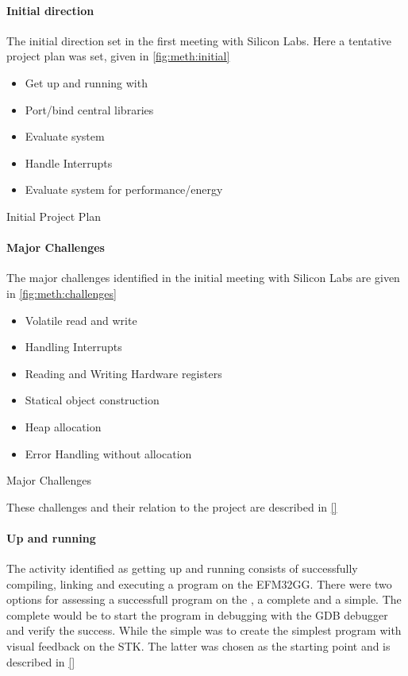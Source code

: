 \paragraph{Initial direction}
The initial direction set in the first meeting with Silicon Labs.
Here a tentative project plan was set, given in \autoref{fig:meth:initial}

\begin{listing}[H]
  \begin{itemize}
    \item Get up and running with \rust
    \item Port/bind central libraries
    \item Evaluate system
    \item Handle Interrupts
    \item Evaluate system for performance/energy
  \end{itemize}
  \caption{Initial Project Plan}
  \label{fig:meth:initial}
\end{listing}

\paragraph{Major Challenges}

The major challenges identified in the initial meeting with Silicon Labs are given in \autoref{fig:meth:challenges}

\begin{listing}[H]
  \begin{itemize}
    \item Volatile read and write
    \item Handling Interrupts
    \item Reading and Writing Hardware registers
    \item Statical object construction
    \item Heap allocation
    \item Error Handling without allocation
  \end{itemize}
  \caption{Major Challenges}
  \label{fig:meth:challenges}
\end{listing}

These challenges and their relation to the project are described in \autoref{} 

\paragraph{Up and running}
The activity identified as getting up and running consists of successfully compiling, linking and executing a \rust program on the EFM32GG.
There were two options for assessing a successfull program on the \gecko, a complete and a simple.
The complete would be to start the program in debugging with the GDB debugger and verify the success.
While the simple was to create the simplest program with visual feedback on the STK.
The latter was chosen as the starting point and is described in \autoref{} 

